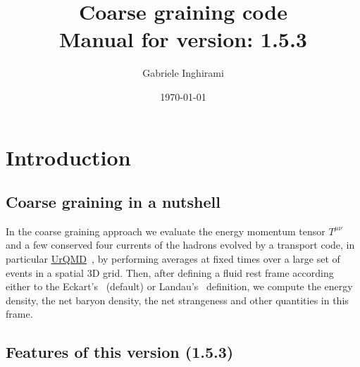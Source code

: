 \documentclass[12pt, a4paper]{article}
\def\vers{\textbf{1.5.3}}
\begin{document}
	\title{Coarse graining code\\\small{Manual for version: \vers}}
	\author{Gabriele Inghirami}
	\date{\today}
	
	\maketitle
	
	\tableofcontents

\section{Introduction}
\subsection{Coarse graining in a nutshell}
In the coarse graining approach we evaluate the energy momentum tensor $T^{\mu\nu}$ and a few conserved four currents of the hadrons evolved by a transport code, in particular 
\href{https://urqmd.org/}{UrQMD}~\cite{Bass:1998ca,Bleicher:1999xi}, by performing averages  at fixed times over a large set of events in a spatial 3D grid. Then, after defining a fluid rest frame according either to the Eckart's~\cite{Eckart:1940te} (default) or Landau's~\cite{landau_fluid_2013} definition, we compute the energy density, the net baryon density, the net strangeness and other quantities in this frame.\\


\subsection{Features of this version (\vers)}
\end{document}
